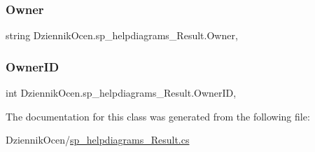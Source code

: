 \subsubsection{\texorpdfstring{Owner}{Owner}}
{\footnotesize\ttfamily string Dziennik\+Ocen.\+sp\+\_\+helpdiagrams\+\_\+\+Result.\+Owner\hspace{0.3cm}{\ttfamily [get]}, {\ttfamily [set]}}

\mbox{\label{class_dziennik_ocen_1_1sp__helpdiagrams___result_a8679d4a8037817f7d591562ecf35b927}} 
\subsubsection{\texorpdfstring{Owner\+ID}{OwnerID}}
{\footnotesize\ttfamily int Dziennik\+Ocen.\+sp\+\_\+helpdiagrams\+\_\+\+Result.\+Owner\+ID\hspace{0.3cm}{\ttfamily [get]}, {\ttfamily [set]}}



The documentation for this class was generated from the following file\+:\begin{DoxyCompactItemize}
\item 
Dziennik\+Ocen/\hyperlink{sp__helpdiagrams___result_8cs}{sp\+\_\+helpdiagrams\+\_\+\+Result.\+cs}\end{DoxyCompactItemize}
